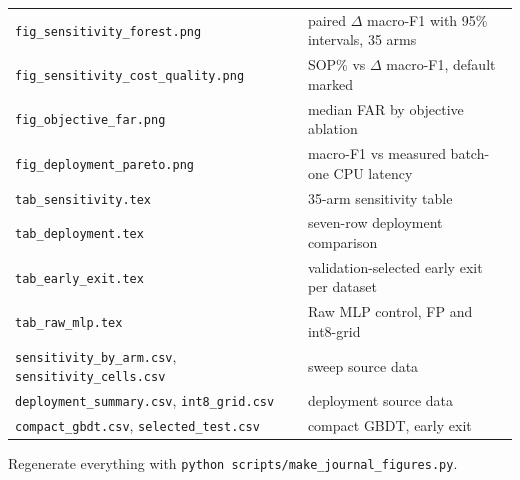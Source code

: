 \begin{tabular}{ll}
\texttt{fig\_sensitivity\_forest.png} & paired $\Delta$ macro-F1 with 95\% intervals,
35 arms \\
\texttt{fig\_sensitivity\_cost\_quality.png} & SOP\% vs $\Delta$ macro-F1, default
marked \\
\texttt{fig\_objective\_far.png} & median FAR by objective ablation \\
\texttt{fig\_deployment\_pareto.png} & macro-F1 vs measured batch-one CPU latency \\
\texttt{tab\_sensitivity.tex} & 35-arm sensitivity table \\
\texttt{tab\_deployment.tex} & seven-row deployment comparison \\
\texttt{tab\_early\_exit.tex} & validation-selected early exit per dataset \\
\texttt{tab\_raw\_mlp.tex} & Raw MLP control, FP and int8-grid \\
\texttt{sensitivity\_by\_arm.csv}, \texttt{sensitivity\_cells.csv} & sweep source data \\
\texttt{deployment\_summary.csv}, \texttt{int8\_grid.csv} & deployment source data \\
\texttt{compact\_gbdt.csv}, \texttt{selected\_test.csv} & compact GBDT, early exit \\
\end{tabular}

\bigskip
\noindent Regenerate everything with
\texttt{python scripts/make\_journal\_figures.py}.
